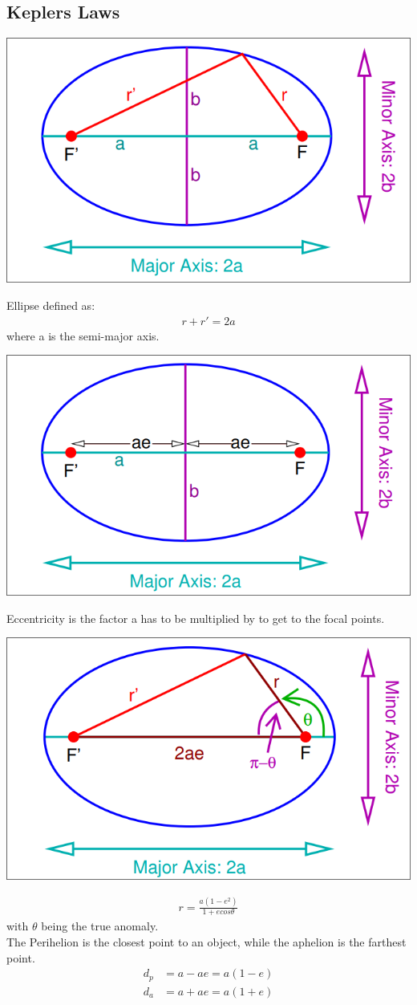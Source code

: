 \documentclass[11pt,a4paper]{article}
\begin{document}
\subsection{Keplers Laws}
\begin{center}
    \includegraphics[width=0.6\linewidth]{screenshot_2024-01-14-181441.png}
\end{center}
Ellipse defined as:
\begin{align}
   r + r' = 2a 
\end{align}
where a is the semi-major axis. 
\begin{center}
    \includegraphics[width=0.6\linewidth]{screenshot_2024-01-14-182015.png}
\end{center}
\newpage
Eccentricity is the factor a has to be multiplied by to get to the focal points. 
\begin{center}
\includegraphics[width=0.6\linewidth]{screenshot_2024-01-14-182509.png}
\end{center}
\begin{align}
    r = \frac{a(1-e^2)}{1+ecos\theta } 
\end{align}
with $\theta$ being the true anomaly.\\
The Perihelion is the closest point to an object, while the aphelion is the farthest point.
\begin{align*}
    d_p &= a - ae = a(1-e) \\  
    d_a &= a + ae = a(1+e) \\  
\end{align*}
\end{document}

